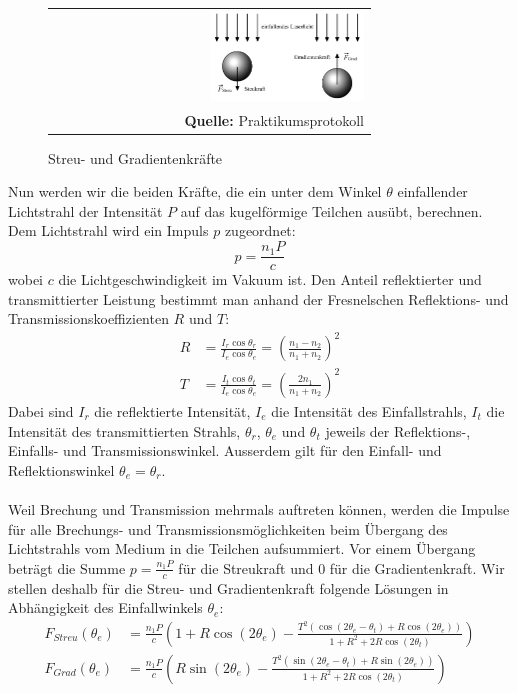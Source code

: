 \documentclass[a4paper,titlepage]{scrartcl}
\numberwithin{equation}{section}
\begin{document}
\begin{figure}[H]
	\centering
	\begin{tabular}{@{}r@{}}
		\includegraphics[width=0.5\textwidth]{streugradientenkraft.png}\\
		\footnotesize\sffamily\textbf{Quelle:} Praktikumsprotokoll \cite{protokoll}
	\end{tabular}
	\caption{Streu- und Gradientenkräfte}
    \label{fig:streugradient}
\end{figure}
Nun werden wir die beiden Kräfte, die ein unter dem Winkel $\theta$ einfallender Lichtstrahl der Intensität $P$ auf das kugelförmige Teilchen ausübt, berechnen. Dem Lichtstrahl wird ein Impuls $p$ zugeordnet:
\begin{equation*}
p=\frac{n_1 P}{c}
\end{equation*}
wobei $c$ die Lichtgeschwindigkeit im Vakuum ist. Den Anteil reflektierter und transmittierter Leistung bestimmt man anhand der Fresnelschen Reflektions- und Transmissionskoeffizienten $R$ und $T$:
\begin{align*}
R&=\frac{I_r \cos{\theta_r}}{I_e \cos{\theta_e}}=\left( \frac{n_1-n_2}{n_1+n_2} \right)^2\\
T&=\frac{I_t \cos{\theta_t}}{I_e \cos{\theta_e}}=\left( \frac{2n_1}{n_1+n_2} \right)^2
\end{align*}
Dabei sind $I_r$ die reflektierte Intensität, $I_e$ die Intensität des Einfallstrahls, $I_t$ die Intensität des transmittierten Strahls, $\theta_r$, $\theta_e$ und $\theta_t$ jeweils der Reflektions-, Einfalls- und Transmissionswinkel. Ausserdem gilt für den Einfall- und Reflektionswinkel $\theta_e=\theta_r$.\\ \\
Weil Brechung und Transmission mehrmals auftreten können, werden die Impulse für alle Brechungs- und Transmissionsmöglichkeiten beim Übergang des Lichtstrahls vom Medium in die Teilchen aufsummiert. Vor einem Übergang beträgt die Summe $p=\frac{n_1 P}{c}$ für die Streukraft und $0$ für die Gradientenkraft. Wir stellen deshalb für die Streu- und Gradientenkraft folgende Lösungen in Abhängigkeit des Einfallwinkels $\theta_e$:
\begin{align*}
F_{Streu}(\theta_e)&=\frac{n_1 P}{c} \left( 1 + R \cos{(2 \theta_e)} - \frac{T^2 (\cos{(2 \theta_e - \theta_t)} + R \cos{(2 \theta_e)})}{1+R^2+2R\cos{(2 \theta_t)}} \right)\\
F_{Grad}(\theta_e)&=\frac{n_1 P}{c} \left( R \sin{(2 \theta_e)} - \frac{T^2 (\sin{(2 \theta_e-\theta_t)} + R \sin{(2 \theta_e)})}{1+R^2+2R\cos{(2 \theta_t)}} \right)
\end{align*}
\end{document}
